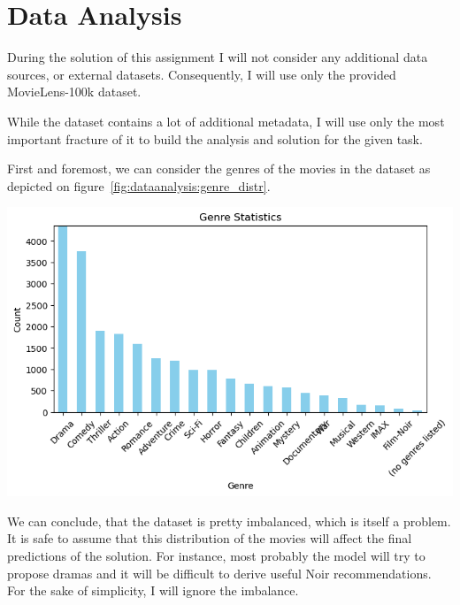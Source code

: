 \section{Data Analysis}
During the solution of this assignment I will not consider any additional data
sources, or external datasets. Consequently, I will use only the provided
MovieLens-100k dataset.

While the dataset contains a lot of additional metadata, I will use only the
most important fracture of it to build the analysis and solution for the given
task.

First and foremost, we can consider the genres of the movies in the dataset as
depicted on figure~\ref{fig:dataanalysis:genre_distr}.

\begin{minipage}{\linewidth}
    \centering%
    \includegraphics[scale=0.3]{assets/genre_distribution.png}%
    \label{fig:dataanalysis:genre_distr}%
\end{minipage}

We can conclude, that the dataset is pretty imbalanced, which is itself a
problem. It is safe to assume that this distribution of the movies will affect
the final predictions of the solution. For instance, most probably the model
will try to propose dramas and it will be difficult to derive useful Noir
recommendations. For the sake of simplicity, I will ignore the imbalance.

